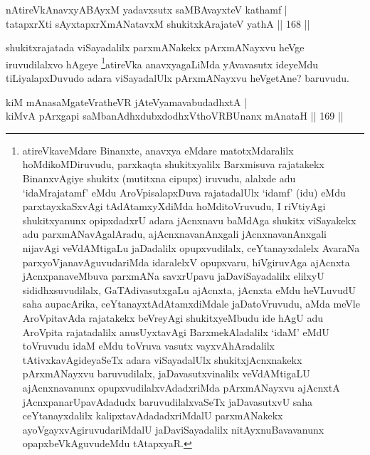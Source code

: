 \begin{shl}
nAtireVkAnavxyABAyxM yadavxsutx saMBAvayxteV kathamf |  \\
tatapxrXti sAyxtapxrXmANatavxM shukitxkArajateV yathA \hfill||  168 ||  
\end{shl}

\begin{artha}
shukitxrajatada viSayadalilx parxmANakekx pArxmANayxvu heVge iruvudilalxvo hAgeye \footnote{atireVkaveMdare Binanxte, anavxya eMdare matotxMdaralilx hoMdikoMDiruvudu, parxkaqta shukitxyalilx Barxmisuva rajatakekx BinanxvAgiye shukitx (mutitxna cipupx) iruvudu, alalxde adu `idaMrajatamf' eMdu AroVpisalapxDuva rajatadalUlx `idamf' (idu) eMdu parxtayxkaSxvAgi tAdAtamxyXdiMda hoMditoVruvudu, I riVtiyAgi shukitxyanunx opipxdadxrU adara jAcnxnavu baMdAga shukitx viSayakekx adu parxmANavAgalAradu, ajAcnxnavanAnxgali jAcnxnavanAnxgali nijavAgi veVdAMtigaLu jaDadalilx opupxvudilalx, ceYtanayxdalelx AvaraNa parxyoVjanavAguvudariMda idaralelxV opupxvaru, hiVgiruvAga ajAcnxta jAcnxpanaveMbuva parxmANa savxrUpavu jaDaviSayadalilx elilxyU sididhxsuvudilalx, GaTAdivasutxgaLu ajAcnxta, jAcnxta eMdu heVLuvudU saha aupacArika, ceYtanayxtAdAtamxdiMdale jaDatoVruvudu, aMda meVle AroVpitavAda rajatakekx beVreyAgi shukitxyeMbudu ide hAgU adu AroVpita rajatadalilx anusUyxtavAgi BarxmekAladalilx `idaM' eMdU toVruvudu idaM eMdu toVruva vasutx vayxvAhAradalilx tAtivxkavAgideyaSeTx adara viSayadalUlx shukitxjAcnxnakekx pArxmANayxvu baruvudilalx, jaDavasutxvinalilx veVdAMtigaLU ajAcnxnavanunx opupxvudilalxvAdadxriMda pArxmANayxvu ajAcnxtA jAcnxpanarUpavAdadudx baruvudilalxvaSeTx jaDavasutxvU saha ceYtanayxdalilx kalipxtavAdadadxriMdalU parxmANakekx ayoVgayxvAgiruvudariMdalU jaDaviSayadalilx nitAyxnuBavavanunx opapxbeVkAguvudeMdu tAtapxyaR.}atireVka anavxyagaLiMda yAvavasutx ideyeMdu tiLiyalapxDuvudo adara viSayadalUlx pArxmANayxvu heVgetAne? baruvudu.
\end{artha}


\begin{shl}
kiM mAnasaMgateVratheVR jAteVyamavabudadhxtA | \\
kiMvA pArxgapi saMbanAdhxdubxdodhxV\s thoVR\s BUnanx mAnataH \hfill||  169 ||  
\end{shl}

